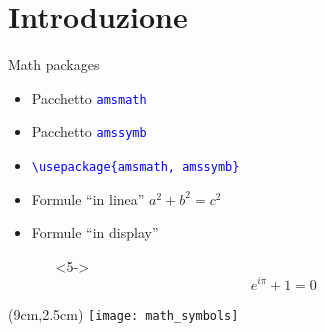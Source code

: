 \section{Introduzione}
  \begin{frame}{Math packages}

    \begin{itemize}
      \item<1-> Pacchetto \texttt{\textcolor{blue}{amsmath}}
      \item<2-> Pacchetto \texttt{\textcolor{blue}{amssymb}}
	  \item<3-> \texttt{\textcolor{blue}{\textbackslash usepackage\{amsmath, amssymb\}}}
    \end{itemize}

    \begin{itemize}
      \item<4-> Formule ``in linea'' $a^2 + b^2 = c^2$
      \item<5-> Formule ``in display''
      \begin{itemize}
        \item[]<5-> \begin{equation} e^{i\pi}+1=0 \end{equation}
      \end{itemize}
    \end{itemize}
    
    \begin{textblock*}{5cm}(9cm,2.5cm)
      \texttt{[image: math\_symbols]}
    \end{textblock*}

\end{frame}
